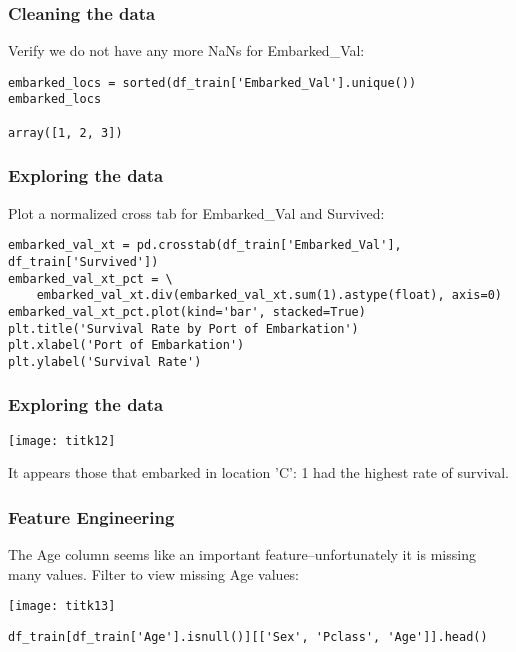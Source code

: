 \begin{frame}[fragile]\frametitle{Cleaning  the data}
Verify we do not have any more NaNs for Embarked\_Val:
\begin{lstlisting}
embarked_locs = sorted(df_train['Embarked_Val'].unique())
embarked_locs

array([1, 2, 3])
\end{lstlisting}
\end{frame}

\begin{frame}[fragile]\frametitle{Exploring  the data}
Plot a normalized cross tab for Embarked\_Val and Survived:
\begin{lstlisting}
embarked_val_xt = pd.crosstab(df_train['Embarked_Val'], df_train['Survived'])
embarked_val_xt_pct = \
    embarked_val_xt.div(embarked_val_xt.sum(1).astype(float), axis=0)
embarked_val_xt_pct.plot(kind='bar', stacked=True)
plt.title('Survival Rate by Port of Embarkation')
plt.xlabel('Port of Embarkation')
plt.ylabel('Survival Rate')
\end{lstlisting}
\end{frame}

\begin{frame}[fragile]\frametitle{Exploring  the data}
\begin{center}
\texttt{[image: titk12]}
\end{center}
It appears those that embarked in location 'C': 1 had the highest rate of survival. 
\end{frame}

\begin{frame}[fragile]\frametitle{Feature Engineering}
The Age column seems like an important feature--unfortunately it is missing many values. Filter to view missing Age values:

\begin{center}
\texttt{[image: titk13]}
\end{center}


\begin{lstlisting}
df_train[df_train['Age'].isnull()][['Sex', 'Pclass', 'Age']].head()
\end{lstlisting}

\end{frame}

